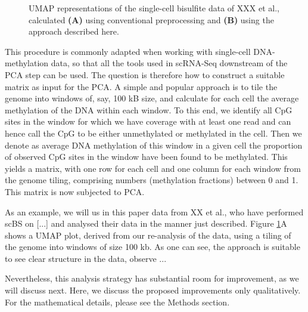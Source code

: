 \documentclass[twocolumn,10pt]{article}
\begin{document}
\begin{figure}
	\caption{\small UMAP representations of the single-cell bisulfite data of XXX et al., calculated \textbf{(A)} using conventional preprocessing and \textbf{(B)} using the approach described here.}
	\label{umaps}
\end{figure}


This procedure is commonly adapted when working with single-cell DNA-methylation data, so that all the tools used in scRNA-Seq downstream of the PCA step can be used. The question is therefore how to construct a suitable matrix as input for the PCA. A simple and popular approach is to tile the genome into windows of, say, 100 kB size, and calculate for each cell the average methylation of the DNA within each window. To this end, we identify all CpG sites in the window for which we have coverage with at least one read and can hence call the CpG to be either unmethylated or methylated in the cell. Then we denote as average DNA methylation of this window in a given cell the proportion of observed CpG sites in the window have been found to be methylated. This yields a matrix, with one row for each cell and one column for each window from the genome tiling, comprising numbers (methylation fractions) between 0 and 1. This matrix is now subjected to PCA.

As an example, we will us in this paper data from XX et al., who have performed scBS on [...] and analysed their data in the manner just described. Figure \ref{umaps}A shows a UMAP plot, derived from our re-analysis of the data, using a tiling of the genome into windows of size 100 kb. As one can see, the approach is suitable to see clear structure in the data, observe ...

Nevertheless, this analysis strategy has substantial room for improvement, as we will discuss next. Here, we discuss the proposed improvements only qualitatively. For the mathematical details, please see the Methods section. 
\end{document}
